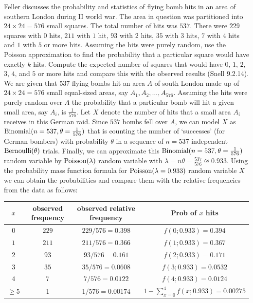 \begin{ExerciseList}
\Exercise
Feller discusses the probability and statistics of flying bomb hits in an area of southern London during II world war.  
The area in question was partitioned into $24 \times 24 = 576$ small squares.  
The total number of hits was $537$.  
There were $229$ squares with $0$ hits, $211$ with $1$ hit, $93$ with $2$ hits, $35$ with $3$ hits, $7$ with $4$ hits and $1$ with $5$ or more hits.  
Assuming the hits were purely random, use the Poisson approximation to find the probability that a particular square would have exactly $k$ hits.  Compute the expected number of squares that would have $0$, $1$, $2$, $3$, $4$, and $5$ or more hits and compare this with the observed results (Snell 9.2.14).  
\Answer
We are given that $537$ flying bombs hit an area $A$ of south London made up of $24 \times 24=576$ small equal-sized areas, say $A_1,A_2,\ldots,A_{576}$.  
Assuming the hits were purely random over $A$ the probability that a particular bomb will hit a given small area, say $A_i$, is $\frac{1}{576}$.  
Let $X$ denote the number of hits that a small area $A_i$ receives in this German raid.  
Since $537$ bombs fell over $A$, we can model $X$ as $\mbox{{\rm Binomial}}(n=537,\theta=\frac{1}{576})$ that is counting the number of `successes' (for German bombers) with probability $\theta$ in a sequence of $n=537$ independent $\mbox{{\rm Bernoulli}}(\theta)$ trials.  
Finally, we can approximate this $\mbox{{\rm Binomial}}(n=537,\theta=\frac{1}{576})$ random variable by $\mbox{{\rm Poisson}}(\lambda)$ random variable with $\lambda=n\theta=\frac{537}{576} \approxeq 0.933$.
Using the probability mass function formula for $\mbox{{\rm Poisson}}(\lambda=0.933)$ random variable $X$ we can obtain the probabilities and compare them with the relative frequencies from the data as follows:

\begin{center}
{\small
\begin{tabular}{|c|c|c|c|}
\hline
$x$ & observed frequency & observed relative frequency & Prob of $x$ hits\\\hline
$0$ & $229$ & $229/576=0.398$ & $f(0;0.933) = 0.394$\\
$1$ & $211$ & $211/576=0.366$ & $f(1;0.933) = 0.367$\\
$2$ & $93$ & $93/576=0.161$ & $f(2;0.933) = 0.171$\\
$3$ & $35$ & $35/576=0.0608$ & $f(3;0.933) = 0.0532$\\
$4$ & $7$ & $7/576=0.0122$ & $f(4;0.933) = 0.0124$\\
$\geq 5$ & $1$ & $1/576=0.00174$ & $1-\sum_{x=0}^4f(x;0.933) = 0.00275$\\\hline
\end{tabular}
}
\end{center}


\end{ExerciseList}

